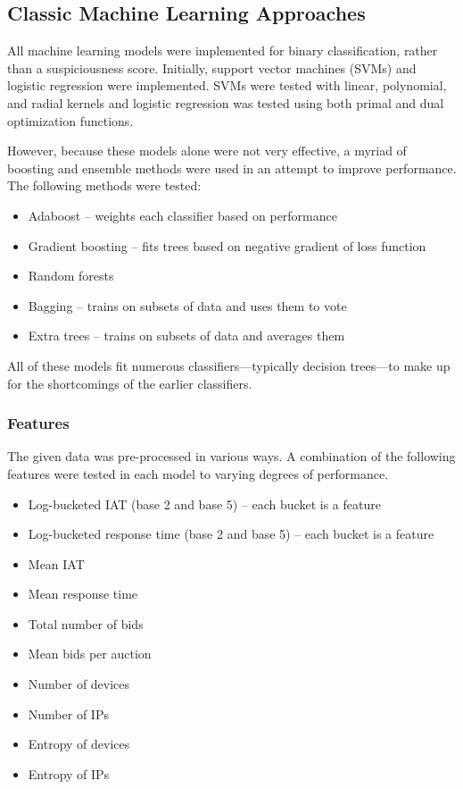 \documentclass{article} %
\begin{document}
\subsection{Classic Machine Learning Approaches}

All machine learning models were implemented for binary classification, rather than a suspiciousness score.
Initially, support vector machines (SVMs) and logistic regression were implemented.
SVMs were tested with linear, polynomial, and radial kernels and logistic regression was tested using both primal and dual optimization functions.

However, because these models alone were not very effective, a myriad of boosting and ensemble methods were used in an attempt to improve performance.
The following methods were tested:

\begin{itemize}
\item Adaboost -- weights each classifier based on performance
\item Gradient boosting -- fits trees based on negative gradient of loss function
\item Random forests
\item Bagging -- trains on subsets of data and uses them to vote
\item Extra trees -- trains on subsets of data and averages them
\end{itemize}

All of these models fit numerous classifiers---typically decision trees---to make up for the shortcomings of the earlier classifiers.

\subsubsection{Features}

The given data was pre-processed in various ways.
A combination of the following features were tested in each model to varying degrees of performance.

\begin{itemize}
\item Log-bucketed IAT (base 2 and base 5) -- each bucket is a feature
\item Log-bucketed response time (base 2 and base 5) -- each bucket is a feature
\item Mean IAT
\item Mean response time
\item Total number of bids
\item Mean bids per auction
\item Number of devices
\item Number of IPs
\item Entropy of devices
\item Entropy of IPs
\end{itemize}
\end{document}
